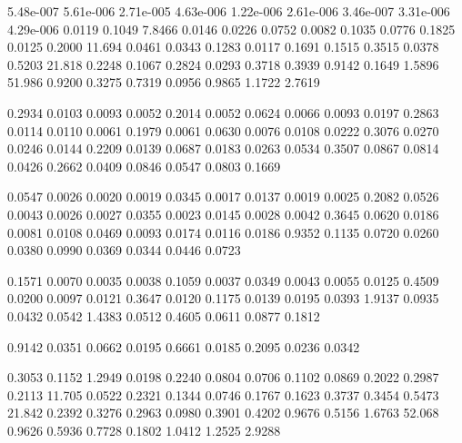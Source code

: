 
5.48e-007   5.61e-006   2.71e-005   4.63e-006   1.22e-006   2.61e-006   3.46e-007   3.31e-006   4.29e-006
    0.0119    0.1049    7.8466    0.0146    0.0226    0.0752    0.0082    0.1035    0.0776    0.1825
    0.0125    0.2000    11.694    0.0461    0.0343    0.1283    0.0117    0.1691    0.1515    0.3515
    0.0378    0.5203    21.818    0.2248    0.1067    0.2824    0.0293    0.3718    0.3939    0.9142
    0.1649    1.5896    51.986    0.9200    0.3275    0.7319    0.0956    0.9865    1.1722    2.7619

    0.2934    0.0103    0.0093    0.0052    0.2014    0.0052    0.0624    0.0066    0.0093    0.0197
    0.2863    0.0114    0.0110    0.0061    0.1979    0.0061    0.0630    0.0076    0.0108    0.0222
    0.3076    0.0270    0.0246    0.0144    0.2209    0.0139    0.0687    0.0183    0.0263    0.0534
    0.3507    0.0867    0.0814    0.0426    0.2662    0.0409    0.0846    0.0547    0.0803    0.1669

    0.0547    0.0026    0.0020    0.0019    0.0345    0.0017    0.0137    0.0019    0.0025    0.2082
    0.0526    0.0043    0.0026    0.0027    0.0355    0.0023    0.0145    0.0028    0.0042    0.3645
    0.0620    0.0186    0.0081    0.0108    0.0469    0.0093    0.0174    0.0116    0.0186    0.9352
    0.1135    0.0720    0.0260    0.0380    0.0990    0.0369    0.0344    0.0446    0.0723

    0.1571    0.0070    0.0035    0.0038    0.1059    0.0037    0.0349    0.0043    0.0055    0.0125
    0.4509    0.0200    0.0097    0.0121    0.3647    0.0120    0.1175    0.0139    0.0195    0.0393
    1.9137    0.0935    0.0432    0.0542    1.4383    0.0512    0.4605    0.0611    0.0877    0.1812

    0.9142    0.0351    0.0662    0.0195    0.6661    0.0185    0.2095    0.0236    0.0342

    0.3053    0.1152    1.2949    0.0198    0.2240    0.0804    0.0706    0.1102    0.0869    0.2022
    0.2987    0.2113    11.705    0.0522    0.2321    0.1344    0.0746    0.1767    0.1623    0.3737
    0.3454    0.5473    21.842    0.2392    0.3276    0.2963    0.0980    0.3901    0.4202    0.9676
    0.5156    1.6763    52.068    0.9626    0.5936    0.7728    0.1802    1.0412    1.2525    2.9288

